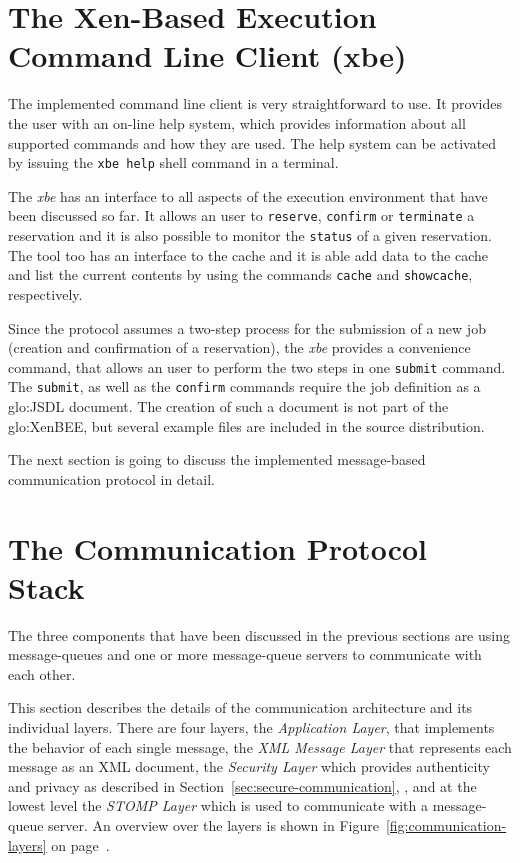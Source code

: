 \section[The Xen-Based Execution Command Line Client]{The Xen-Based Execution
  Command Line Client (xbe)}
\label{sec:command-line-client}

The implemented  command line  client is very  straightforward to  use. It
provides the user with an  on-line help system, which provides information
about all supported commands and how they are used. The help system can be
activated by issuing the \texttt{xbe help} shell command in a terminal.

The  \emph{xbe}  has  an  interface   to  all  aspects  of  the  execution
environment  that  have been  discussed  so far.   It  allows  an user  to
\texttt{reserve}, \texttt{confirm} or \texttt{terminate} a reservation and
it  is   also  possible  to   monitor  the  \texttt{status}  of   a  given
reservation. The tool too has an interface to the cache and it is able add
data to  the cache  and list  the current contents  by using  the commands
\texttt{cache} and \texttt{showcache}, respectively.

Since the protocol assumes a two-step  process for the submission of a new
job  (\ie creation  and  confirmation of  a  reservation), the  \emph{xbe}
provides a  convenience command,  that allows an  user to perform  the two
steps in one \texttt{submit} command.  The \texttt{submit}, as well as the
\texttt{confirm} commands  require the job definition  as a \gls{glo:JSDL}
document.   The  creation   of  such  a  document  is   not  part  of  the
\gls{glo:XenBEE},  but several example  files are  included in  the source
distribution.

\medskip

The  next  section  is  going  to discuss  the  implemented  message-based
communication protocol in detail.

\section{The Communication Protocol Stack}
\label{sec:communication-protocol}

The three components that have been discussed in the previous sections are
using message-queues and one  or more message-queue servers to communicate
with each other.

This section  describes the details of the  communication architecture and
its  individual  layers.  There  are  four  layers, the  \emph{Application
  Layer},  that  implements  the  behavior  of each  single  message,  the
\emph{XML Message Layer} that represents  each message as an XML document,
the  \emph{Security  Layer} which  provides  authenticity  and privacy  as
described            in            Section~\ref{sec:secure-communication},
\emph{},  and at  the  lowest level  the
\emph{STOMP  Layer} which  is  used to  communicate  with a  message-queue
server.     An     overview    over    the    layers     is    shown    in
Figure~\ref{fig:communication-layers}                                    on
page~\pageref{fig:communication-layers}.

